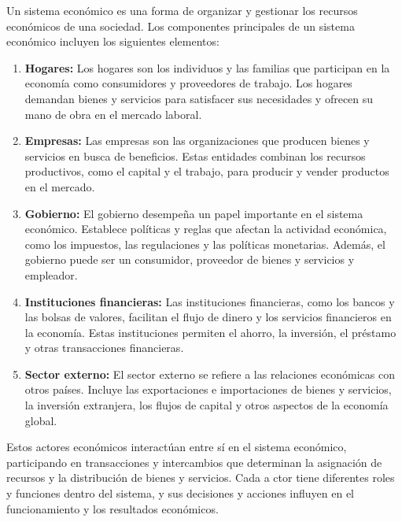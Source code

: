 \documentclass[
  letterpaper,
  DIV=11,
  numbers=noendperiod]{scrartcl}
\begin{document}
Un sistema económico es una forma de organizar y gestionar los recursos
económicos de una sociedad. Los componentes principales de un sistema
económico incluyen los siguientes elementos:

\begin{enumerate}
\def\labelenumi{\arabic{enumi}.}
\item
  \textbf{Hogares:} Los hogares son los individuos y las familias que
  participan en la economía como consumidores y proveedores de trabajo.
  Los hogares demandan bienes y servicios para satisfacer sus
  necesidades y ofrecen su mano de obra en el mercado laboral.
\item
  \textbf{Empresas:} Las empresas son las organizaciones que producen
  bienes y servicios en busca de beneficios. Estas entidades combinan
  los recursos productivos, como el capital y el trabajo, para producir
  y vender productos en el mercado.
\item
  \textbf{Gobierno:} El gobierno desempeña un papel importante en el
  sistema económico. Establece políticas y reglas que afectan la
  actividad económica, como los impuestos, las regulaciones y las
  políticas monetarias. Además, el gobierno puede ser un consumidor,
  proveedor de bienes y servicios y empleador.
\item
  \textbf{Instituciones financieras:} Las instituciones financieras,
  como los bancos y las bolsas de valores, facilitan el flujo de dinero
  y los servicios financieros en la economía. Estas instituciones
  permiten el ahorro, la inversión, el préstamo y otras transacciones
  financieras.
\item
  \textbf{Sector externo:} El sector externo se refiere a las relaciones
  económicas con otros países. Incluye las exportaciones e importaciones
  de bienes y servicios, la inversión extranjera, los flujos de capital
  y otros aspectos de la economía global.
\end{enumerate}

Estos actores económicos interactúan entre sí en el sistema económico,
participando en transacciones y intercambios que determinan la
asignación de recursos y la distribución de bienes y servicios. Cada a
ctor tiene diferentes roles y funciones dentro del sistema, y sus
decisiones y acciones influyen en el funcionamiento y los resultados
económicos.


\printbibliography
\end{document}
